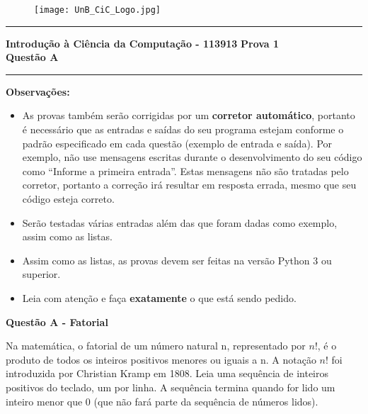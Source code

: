 \documentclass[a4paper, 12pt]{article}
\begin{document}
\begin{figure}[H]
	\texttt{[image: UnB\_CiC\_Logo.jpg]}
\end{figure}
\noindent\rule{\textwidth}{0.4pt}
\begin{center}
	\textbf{{\Large Introdução à Ciência da Computação - 113913}} \newline \newline
	\textbf{{\large Prova 1} \\
	\vspace{9pt}
	{\large Questão A}} \\
	\noindent\rule{\textwidth}{0.4pt}
	\newline
\end{center}

\textbf{{\large Observações:}}
\begin{itemize}
	\item As provas também serão corrigidas por um \textbf{corretor automático}, portanto é necessário que as entradas e saídas do seu programa estejam conforme o padrão especificado em cada questão (exemplo de entrada e saída). Por exemplo, não use mensagens escritas durante o desenvolvimento do seu código como “Informe a primeira entrada”. Estas mensagens não são tratadas pelo corretor, portanto a correção irá resultar em resposta errada, mesmo que seu código esteja correto.
	\item Serão testadas várias entradas além das que foram dadas como exemplo, assim como as listas.
	\item Assim como as listas, as provas devem ser feitas na versão Python 3 ou superior.
	\item Leia com atenção e faça \textbf{exatamente} o que está sendo pedido.
\end{itemize}
\newpage %
\begin{center}
\textbf{{\Large Questão A - Fatorial}}
\end{center}
\vspace{5pt}
Na matemática, o fatorial de um número natural n, representado por $n!$, é o produto de todos os inteiros positivos menores ou iguais a n. A notação $n!$ foi introduzida por Christian Kramp em 1808. \newline \newline Leia uma sequência de inteiros positivos do teclado, um por linha. A sequência termina quando for lido um inteiro menor que 0 (que não fará parte da sequência de números lidos).
\newline \newline
\end{document}
